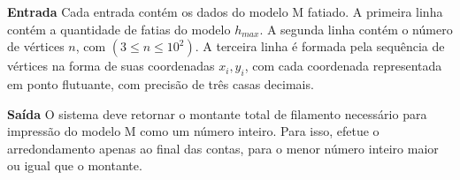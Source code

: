 {\vspace{0.3cm}
\textbf{Entrada}
Cada entrada contém os dados do modelo M fatiado. A primeira linha contém a quantidade de fatias do modelo $h_{max}$. A segunda linha contém o número de vértices $n$, com $(3 \leq n \leq 10^2)$. A terceira linha é formada pela sequência de vértices na forma de suas coordenadas $x_i, y_i$, com cada coordenada representada em ponto flutuante, com precisão de três casas decimais.


\vspace{0.3cm}
\textbf{Saída}
O sistema deve retornar o montante total de filamento necessário para impressão do modelo M como um número inteiro. Para isso, efetue o arredondamento apenas ao final das contas, para o menor número inteiro maior ou igual que o montante. 


}
